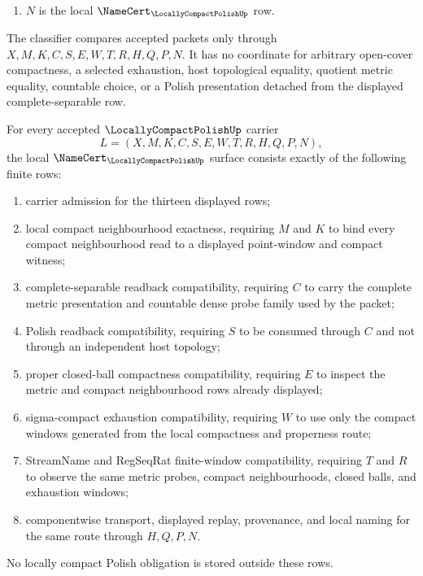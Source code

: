 \begin{definition}
\begin{enumerate}
\item $N$ is the local $\NameCert_{\LocallyCompactPolishUp}$ row.
\end{enumerate}
The classifier compares accepted packets only through $X,M,K,C,S,E,W,T,R,H,Q,P,N$. It has no coordinate for arbitrary open-cover compactness, a selected exhaustion, host topological equality, quotient metric equality, countable choice, or a Polish presentation detached from the displayed complete-separable row.
\end{definition}

\begin{theorem}
\label{thm:locally-compact-polish-namecert-obligations}
For every accepted $\LocallyCompactPolishUp$ carrier
$$
L=(X,M,K,C,S,E,W,T,R,H,Q,P,N),
$$
the local $\NameCert_{\LocallyCompactPolishUp}$ surface consists exactly of the following finite rows:
\begin{enumerate}
\item carrier admission for the thirteen displayed rows;
\item local compact neighbourhood exactness, requiring $M$ and $K$ to bind every compact neighbourhood read to a displayed point-window and compact witness;
\item complete-separable readback compatibility, requiring $C$ to carry the complete metric presentation and countable dense probe family used by the packet;
\item Polish readback compatibility, requiring $S$ to be consumed through $C$ and not through an independent host topology;
\item proper closed-ball compactness compatibility, requiring $E$ to inspect the metric and compact neighbourhood rows already displayed;
\item sigma-compact exhaustion compatibility, requiring $W$ to use only the compact windows generated from the local compactness and properness route;
\item StreamName and RegSeqRat finite-window compatibility, requiring $T$ and $R$ to observe the same metric probes, compact neighbourhoods, closed balls, and exhaustion windows;
\item componentwise transport, displayed replay, provenance, and local naming for the same route through $H,Q,P,N$.
\end{enumerate}
No locally compact Polish obligation is stored outside these rows.
\end{theorem}

